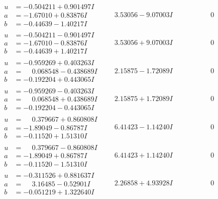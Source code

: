 \documentclass[1p]{elsarticle_modified}
\theoremstyle{definition}
\begin{document}
$$\begin{array}{c|c|c}
\begin{aligned}
u &= -0.504211 + 0.901497 I \\
a &= -1.67010 + 0.83876 I \\
b &= -0.44639 - 1.40217 I\end{aligned}
 & \phantom{-}3.53056 - 9.07003 I & \phantom{-0.000000 } 0 \\ \hline\begin{aligned}
u &= -0.504211 - 0.901497 I \\
a &= -1.67010 - 0.83876 I \\
b &= -0.44639 + 1.40217 I\end{aligned}
 & \phantom{-}3.53056 + 9.07003 I & \phantom{-0.000000 } 0 \\ \hline\begin{aligned}
u &= -0.959269 + 0.403263 I \\
a &= \phantom{-}0.068548 - 0.438689 I \\
b &= -0.192204 + 0.443065 I\end{aligned}
 & \phantom{-}2.15875 - 1.72089 I & \phantom{-0.000000 } 0 \\ \hline\begin{aligned}
u &= -0.959269 - 0.403263 I \\
a &= \phantom{-}0.068548 + 0.438689 I \\
b &= -0.192204 - 0.443065 I\end{aligned}
 & \phantom{-}2.15875 + 1.72089 I & \phantom{-0.000000 } 0 \\ \hline\begin{aligned}
u &= \phantom{-}0.379667 + 0.860808 I \\
a &= -1.89049 - 0.86787 I \\
b &= -0.11520 + 1.51310 I\end{aligned}
 & \phantom{-}6.41423 - 1.14240 I & \phantom{-0.000000 } 0 \\ \hline\begin{aligned}
u &= \phantom{-}0.379667 - 0.860808 I \\
a &= -1.89049 + 0.86787 I \\
b &= -0.11520 - 1.51310 I\end{aligned}
 & \phantom{-}6.41423 + 1.14240 I & \phantom{-0.000000 } 0 \\ \hline\begin{aligned}
u &= -0.311526 + 0.881637 I \\
a &= \phantom{-}3.16485 - 0.52901 I \\
b &= -0.051219 + 1.322640 I\end{aligned}
 & \phantom{-}2.26858 + 4.93928 I & \phantom{-0.000000 } 0 \\ \hline\begin{aligned}

\end{aligned}
\end{array}$$
\end{document}
